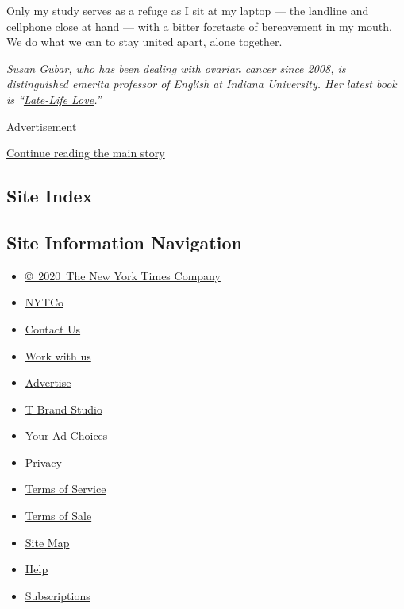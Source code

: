 Only my study serves as a refuge as I sit at my laptop --- the landline
and cellphone close at hand --- with a bitter foretaste of bereavement
in my mouth. We do what we can to stay united apart, alone together.

\emph{Susan Gubar, who has been dealing with ovarian cancer since 2008,
is distinguished emerita professor of English at Indiana University. Her
latest book is
``}\href{https://www.nytimes3xbfgragh.onion/2018/12/28/books/review/susan-gubar-late-life-love.html?module=inline}{\emph{Late-Life
Love}}\emph{.''}

Advertisement

\protect\hyperlink{after-bottom}{Continue reading the main story}

\hypertarget{site-index}{%
\subsection{Site Index}\label{site-index}}

\hypertarget{site-information-navigation}{%
\subsection{Site Information
Navigation}\label{site-information-navigation}}

\begin{itemize}
\tightlist
\item
  \href{https://help.nytimes3xbfgragh.onion/hc/en-us/articles/115014792127-Copyright-notice}{©~2020~The
  New York Times Company}
\end{itemize}

\begin{itemize}
\tightlist
\item
  \href{https://www.nytco.com/}{NYTCo}
\item
  \href{https://help.nytimes3xbfgragh.onion/hc/en-us/articles/115015385887-Contact-Us}{Contact
  Us}
\item
  \href{https://www.nytco.com/careers/}{Work with us}
\item
  \href{https://nytmediakit.com/}{Advertise}
\item
  \href{http://www.tbrandstudio.com/}{T Brand Studio}
\item
  \href{https://www.nytimes3xbfgragh.onion/privacy/cookie-policy\#how-do-i-manage-trackers}{Your
  Ad Choices}
\item
  \href{https://www.nytimes3xbfgragh.onion/privacy}{Privacy}
\item
  \href{https://help.nytimes3xbfgragh.onion/hc/en-us/articles/115014893428-Terms-of-service}{Terms
  of Service}
\item
  \href{https://help.nytimes3xbfgragh.onion/hc/en-us/articles/115014893968-Terms-of-sale}{Terms
  of Sale}
\item
  \href{https://spiderbites.nytimes3xbfgragh.onion}{Site Map}
\item
  \href{https://help.nytimes3xbfgragh.onion/hc/en-us}{Help}
\item
  \href{https://www.nytimes3xbfgragh.onion/subscription?campaignId=37WXW}{Subscriptions}
\end{itemize}
